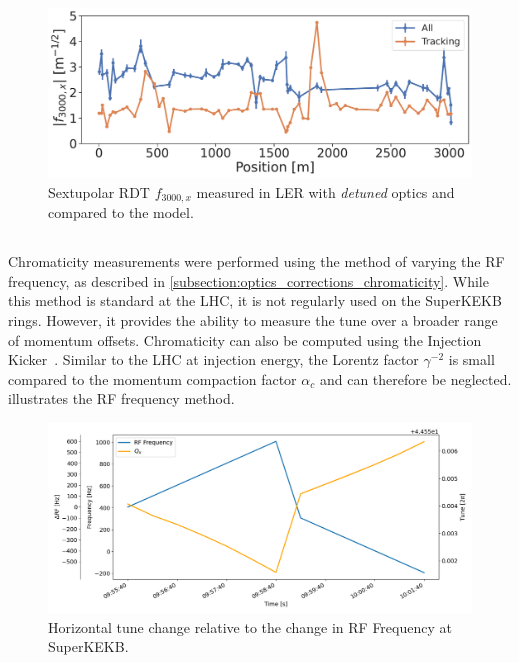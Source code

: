 \begin{figure}[!htb]
    \centering
    \includegraphics[width=0.8\linewidth]{images/kek/f3000x_LER.pdf}
    \caption{Sextupolar RDT $f_{3000,x}$ measured in LER with \textit{detuned} optics and compared
    to the model.}
    \label{fig:kek:rdt_f3000x_LER}
\end{figure}



\FloatBarrier
\subsection{}

Chromaticity measurements were performed using the method of varying the RF frequency, as described
in \cref{subsection:optics_corrections_chromaticity}. While this method is standard at the LHC, it
is not regularly used on the SuperKEKB rings. However, it provides the ability to measure the tune
over a broader range of momentum offsets. Chromaticity can also be computed using the Injection
Kicker~\cite{keintzel_jacqueline_beam_2022}. Similar to the LHC at injection energy, the Lorentz
factor $\gamma^{-2}$ is small compared to the momentum compaction factor $\alpha_c$ and can
therefore be neglected.
 illustrates the RF frequency method.

\begin{figure}[!htb]
    \centering
    \includegraphics[width=0.8\linewidth]{images/kek/rf_qx.png}
    \caption{Horizontal tune change relative to the change in RF Frequency at SuperKEKB.}
    \label{fig:kek:chroma_procedure}
\end{figure}

